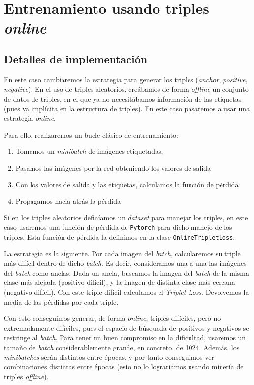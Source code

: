 \documentclass[11pt]{article}
\begin{document}
\pagebreak

\section{Entrenamiento usando triples \emph{online}}

\subsection{Detalles de implementación}

En este caso cambiaremos la estrategia para generar los triples (\emph{anchor}, \emph{positive}, \emph{negative}). En el uso de triples aleatorios, creábamos de forma \emph{offline} un conjunto de datos de triples, en el que ya no necesitábamos información de las etiquetas (pues va implícita en la estructura de triples). En este caso pasaremos a usar una estrategia \emph{online}.

Para ello, realizaremos un bucle clásico de entrenamiento:

\begin{enumerate}
  \item Tomamos un \emph{minibatch} de imágenes etiquetadas,
  \item Pasamos las imágenes por la red obteniendo los valores de salida
  \item Con los valores de salida y las etiquetas, calculamos la función de pérdida
  \item Propagamos hacia atrás la pérdida
\end{enumerate}

Si en los triples aleatorios definíamos un \emph{dataset} para manejar los triples, en este caso usaremos una función de pérdida de \lstinline{Pytorch} para dicho manejo de los triples. Esta función de pérdida la definimos en la clase \lstinline{OnlineTripletLoss}.

La estrategia es la siguiente. Por cada imagen del \emph{batch}, calcularemos su triple más difícil dentro de dicho \emph{batch}. Es decir, consideramos una a una las imágenes del \emph{batch} como anclas. Dada un ancla, buscamos la imagen del \emph{batch} de la misma clase más alejada (positivo difícil), y la imagen de distinta clase más cercana (negativo difícil). Con este triple difícil calculamos el \emph{Triplet Loss}. Devolvemos la media de las pérdidas por cada triple.

Con esto conseguimos generar, de forma \emph{online}, triples difíciles, pero no extremadamente difíciles, pues el espacio de búsqueda de positivos y negativos se restringe al \emph{batch}. Para tener un buen compromiso en la dificultad, usaremos un tamaño de \emph{batch} considerablemente grande, en concreto, de 1024. Además, los \emph{minibatches} serán distintos entre épocas, y por tanto conseguimos ver combinaciones distintas entre épocas (esto no lo lograríamos usando minería de triples \emph{offline}).
\end{document}
